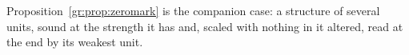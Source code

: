 \noindent Proposition~\ref{gr:prop:zeromark} is the companion case: a
structure of several units, sound at the strength it has and, scaled with
nothing in it altered, read at the end by its weakest unit.

